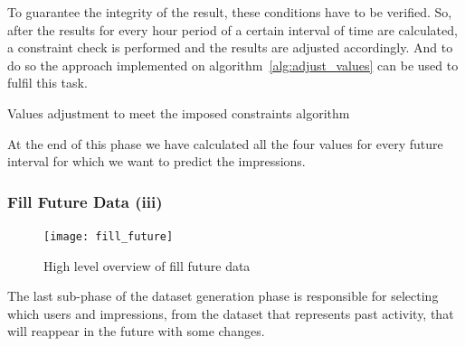 To guarantee the integrity of the result, these conditions have to be verified.
So, after the results for every hour period of a certain interval of time are
calculated, a constraint check is performed and the results are adjusted
accordingly. 
And to do so the approach implemented on
algorithm~\ref{alg:adjust_values} can be used to fulfil this task.
\\

\begin{algorithm}[H]
  \LinesNumbered
  \BlankLine

  \BlankLine
  \vspace{0.5cm}
  \caption[Constraint adjustement for statistics]{
    Values adjustment to meet the imposed constraints algorithm
  }
  \label{alg:adjust_values} \end{algorithm}

At the end of this phase we have calculated all the four
values for every future interval for which we want to predict the impressions.


\subsubsection{Fill Future Data (iii)}\label{subsubsec:fill_data}

\begin{figure}[h] \begin{center} \leavevmode
\texttt{[image: fill\_future]} \caption{ High level overview
of fill future data} \label{fig:fill_future_iii} \end{center} \end{figure}

The last sub-phase of the dataset generation phase is responsible for selecting
which users and impressions, from the dataset that represents past activity,
that will reappear in the future with some changes.

